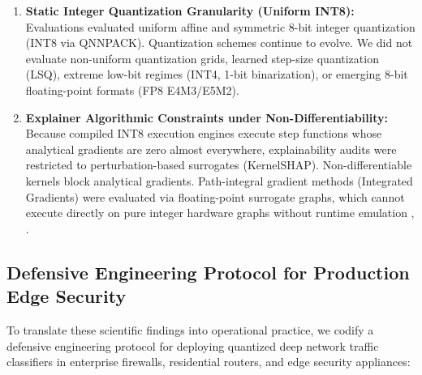 \documentclass[conference]{IEEEtran}
\begin{document}
\begin{enumerate}
    \item \textbf{Static Integer Quantization Granularity (Uniform INT8):} Evaluations evaluated uniform affine and symmetric 8-bit integer quantization (INT8 via QNNPACK). Quantization schemes continue to evolve. We did not evaluate non-uniform quantization grids, learned step-size quantization (LSQ), extreme low-bit regimes (INT4, 1-bit binarization), or emerging 8-bit floating-point formats (FP8 E4M3/E5M2).
    \item \textbf{Explainer Algorithmic Constraints under Non-Differentiability:} Because compiled INT8 execution engines execute step functions whose analytical gradients are zero almost everywhere, explainability audits were restricted to perturbation-based surrogates (KernelSHAP). Non-differentiable kernels block analytical gradients. Path-integral gradient methods (Integrated Gradients) were evaluated via floating-point surrogate graphs, which cannot execute directly on pure integer hardware graphs without runtime emulation \cite{b29}, \cite{b33}.
\end{enumerate}

\subsection{Defensive Engineering Protocol for Production Edge Security}
To translate these scientific findings into operational practice, we codify a defensive engineering protocol for deploying quantized deep network traffic classifiers in enterprise firewalls, residential routers, and edge security appliances:
\end{document}
